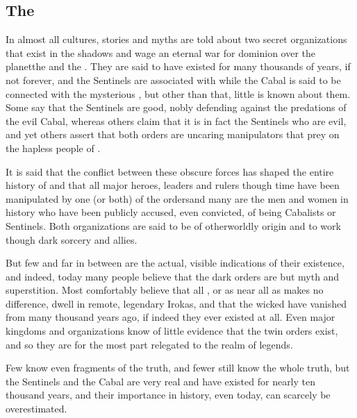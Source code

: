 








\subsection{The \Feud}
In almost all \Miithian{} cultures, stories and myths are told about two secret organizations that exist in the shadows and wage an eternal war for dominion over the planet\dash{}the  and the . 
They are said to have existed for many thousands of years, if not forever, and the Sentinels are associated with \dragons{} while the Cabal is said to be connected with the mysterious \banes{}, but other than that, little is known about them. Some say that the Sentinels are good, nobly defending \Miith{} against the predations of the evil Cabal, whereas others claim that it is in fact the Sentinels who are evil, and yet others assert that both orders are uncaring manipulators that prey on the hapless people of \Miith{}. 

It is said that the conflict between these obscure forces has shaped the entire history of \Miith{} and that all major heroes, leaders and rulers though time have been manipulated by one (or both) of the orders\dash{}and many are the men and women in history who have been publicly accused, even convicted, of being Cabalists or Sentinels. Both organizations are said to be of otherworldly origin and to work though dark sorcery and \daemonic{} allies. 

But few and far in between are the actual, visible indications of their existence, and indeed, today many people believe that the dark orders are but myth and superstition. Most \Velcadians{} comfortably believe that all \dragons{}, or as near all as makes no difference, dwell in remote, legendary Irokas, and that the wicked \banes{} have vanished from \Miith{} many thousand years ago, if indeed they ever existed at all. Even major kingdoms and organizations know of little evidence that the twin orders exist, and so they are for the most part relegated to the realm of legends. 

Few know even fragments of the truth, and fewer still know the whole truth, but the Sentinels and the Cabal are very real and have existed for nearly ten thousand years, and their importance in \Miithian{} history, even today, can scarcely be overestimated. 









